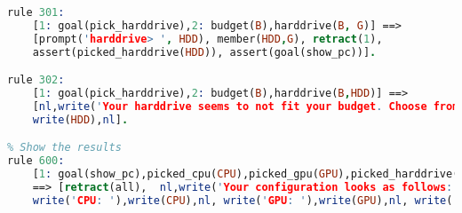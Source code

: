 \documentclass[12pt]{article}
\begin{document}
\begin{lstlisting}[language=Prolog]
rule 301:
	[1: goal(pick_harddrive),2: budget(B),harddrive(B, G)] ==>
	[prompt('harddrive> ', HDD), member(HDD,G), retract(1),
	assert(picked_harddrive(HDD)), assert(goal(show_pc))].

rule 302:
	[1: goal(pick_harddrive),2: budget(B),harddrive(B,HDD)] ==>
	[nl,write('Your harddrive seems to not fit your budget. Choose from the following:'),nl,
	write(HDD),nl].

% Show the results
rule 600:
	[1: goal(show_pc),picked_cpu(CPU),picked_gpu(GPU),picked_harddrive(HDD)]
	==>	[retract(all), 	nl,write('Your configuration looks as follows:'),nl,nl,
	write('CPU: '),write(CPU),nl, write('GPU: '),write(GPU),nl, write('Harddrive: '),write(HDD),nl.
\end{lstlisting}
\end{document}
